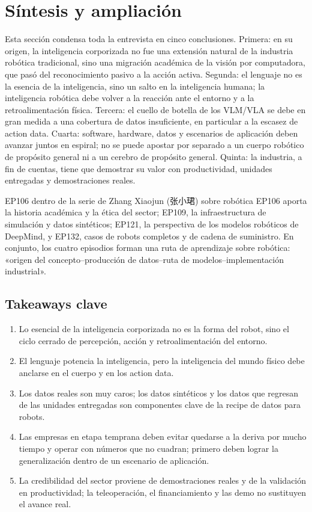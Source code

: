 \section{Síntesis y ampliación}

Esta sección condensa toda la entrevista en cinco conclusiones. Primera: en su origen, la inteligencia corporizada no fue una extensión natural de la industria robótica tradicional, sino una migración académica de la visión por computadora, que pasó del reconocimiento pasivo a la acción activa. Segunda: el lenguaje no es la esencia de la inteligencia, sino un salto en la inteligencia humana; la inteligencia robótica debe volver a la reacción ante el entorno y a la retroalimentación física. Tercera: el cuello de botella de los VLM/VLA se debe en gran medida a una cobertura de datos insuficiente, en particular a la escasez de action data. Cuarta: software, hardware, datos y escenarios de aplicación deben avanzar juntos en espiral; no se puede apostar por separado a un cuerpo robótico de propósito general ni a un cerebro de propósito general. Quinta: la industria, a fin de cuentas, tiene que demostrar su valor con productividad, unidades entregadas y demostraciones reales.

\begin{importantbox}{EP106 dentro de la serie de Zhang Xiaojun (张小珺) sobre robótica}
EP106 aporta la historia académica y la ética del sector; EP109, la infraestructura de simulación y datos sintéticos; EP121, la perspectiva de los modelos robóticos de DeepMind, y EP132, casos de robots completos y de cadena de suministro. En conjunto, los cuatro episodios forman una ruta de aprendizaje sobre robótica: «origen del concepto--producción de datos--ruta de modelos--implementación industrial».
\end{importantbox}

\subsection{Takeaways clave}

\begin{enumerate}
\item Lo esencial de la inteligencia corporizada no es la forma del robot, sino el ciclo cerrado de percepción, acción y retroalimentación del entorno.
\item El lenguaje potencia la inteligencia, pero la inteligencia del mundo físico debe anclarse en el cuerpo y en los action data.
\item Los datos reales son muy caros; los datos sintéticos y los datos que regresan de las unidades entregadas son componentes clave de la recipe de datos para robots.
\item Las empresas en etapa temprana deben evitar quedarse a la deriva por mucho tiempo y operar con números que no cuadran; primero deben lograr la generalización dentro de un escenario de aplicación.
\item La credibilidad del sector proviene de demostraciones reales y de la validación en productividad; la teleoperación, el financiamiento y las demo no sustituyen el avance real.
\end{enumerate}

